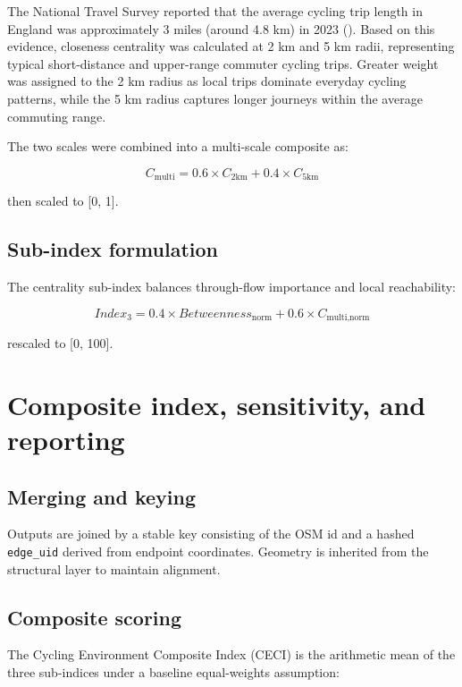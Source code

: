 \documentclass[
  12pt,
  oneside]{book}
\begin{document}
The National Travel Survey reported that the average cycling trip length in England was approximately 3 miles (around 4.8 km) in 2023 (\textcite{dft_nts_2024}). Based on this evidence, closeness centrality was calculated at 2 km and 5 km radii, representing typical short-distance and upper-range commuter cycling trips. Greater weight was assigned to the 2 km radius as local trips dominate everyday cycling patterns, while the 5 km radius captures longer journeys within the average commuting range.

The two scales were combined into a multi-scale composite as:

\[C_{\text{multi}} = 0.6 \times C_{2\text{km}} + 0.4 \times C_{5\text{km}}\]

then scaled to {[}0, 1{]}.

\subsection{Sub-index formulation}\label{sub-index-formulation-1}

The centrality sub-index balances through-flow importance and local reachability:

\[Index_{3} = 0.4 \times Betweenness_{\text{norm}} + 0.6 \times C_{\text{multi,norm}}\]

rescaled to {[}0, 100{]}.

\section{Composite index, sensitivity, and reporting}\label{composite-index-sensitivity-and-reporting}

\subsection{Merging and keying}\label{merging-and-keying}

Outputs are joined by a stable key consisting of the OSM id and a hashed \texttt{edge\_uid} derived from endpoint coordinates. Geometry is inherited from the structural layer to maintain alignment.

\subsection{Composite scoring}\label{composite-scoring}

The Cycling Environment Composite Index (CECI) is the arithmetic mean of the three sub-indices under a baseline equal-weights assumption:
\end{document}
